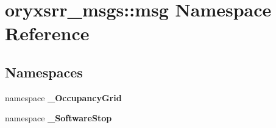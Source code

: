 \section{oryxsrr\-\_\-msgs\-:\-:msg \-Namespace \-Reference}
\label{namespaceoryxsrr__msgs_1_1msg}
\subsection*{\-Namespaces}
\begin{DoxyCompactItemize}
\item 
namespace {\bf \-\_\-\-Occupancy\-Grid}
\item 
namespace {\bf \-\_\-\-Software\-Stop}
\end{DoxyCompactItemize}
